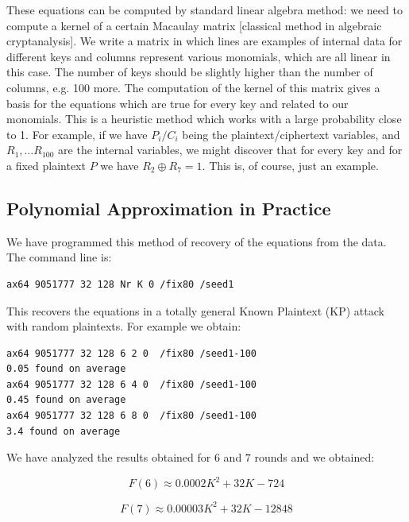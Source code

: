 These equations can be computed by standard linear algebra method:
we need to compute a kernel of a certain Macaulay matrix
[classical method in algebraic cryptanalysis].
We write a matrix
in which lines are examples of internal data for different keys
and columns represent various monomials,
which are all linear in this case.
The number of keys should be slightly higher than the number of columns,
e.g. 100 more.
The computation of the kernel of this matrix gives
a basis for the equations which are true for every key and related to our
monomials. This is a heuristic method which works with a large probability close to 1. 
For example, if we have $P_i/C_i$ being the plaintext/ciphertext variables,
and $R_1,\ldots R_{100}$ are the internal variables,
we might discover that for every key and for a fixed plaintext $P$
we have
$R_2\oplus R_7=1$. This is, of course, just an example.

\subsection{Polynomial Approximation in Practice}

We have programmed this method of recovery of the equations from the data.
The command line is:


\begin{verbatim}
ax64 9051777 32 128 Nr K 0 /fix80 /seed1
\end{verbatim}

This recovers the equations in a totally general Known Plaintext (KP) attack with random
plaintexts.
For example we obtain:
\begin{verbatim}
ax64 9051777 32 128 6 2 0  /fix80 /seed1-100
0.05 found on average
ax64 9051777 32 128 6 4 0  /fix80 /seed1-100
0.45 found on average
ax64 9051777 32 128 6 8 0  /fix80 /seed1-100
3.4 found on average
\end{verbatim}

We have analyzed the results obtained for $6$ and $7$ rounds
and we obtained:

\vskip-4pt
\vskip-4pt
$$
F(6)\approx 0.0002 K^2 + 32 K - 724
$$
\vskip-4pt

\vskip-4pt
\vskip-4pt
$$
F(7)\approx 0.00003 K^2 + 32 K - 12848
$$
\vskip-4pt

